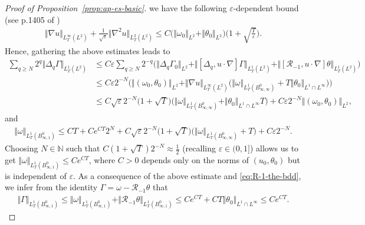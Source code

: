 \documentclass[reqno,11pt,a4paper]{amsart}
\begin{document}
\begin{proof}[Proof of Proposition~\ref{prop:ap-es-basic}]
we have the following $\varepsilon$-dependent bound (see p.1405 of \cite{LXY25})
\begin{align*}
  \Vert \nabla u \Vert _{L^\infty_T(L^2)} + \frac{1}{\sqrt{\varepsilon}} \Vert \nabla^2 u\Vert _{L^2_T(L^2)}
  \leq C \big(\Vert \omega_0\Vert _{L^2} + \Vert \theta_0\Vert _{L^2} \big)\Big(1+\sqrt{\tfrac{T}{\varepsilon}}\Big).
\end{align*}
Hence, gathering the above estimates leads to
\begin{align*}
  \sum_{q\geq N} 2^q \Vert \Delta_q \Gamma\Vert _{L^1_T(L^2)} 
  & \leq C \varepsilon \sum_{q\geq N} 2^{-q} \Big( \Vert \Delta_q \Gamma_0\Vert _{L^2} 
  + \Vert [\Delta_q, u\cdot\nabla]\Gamma\Vert _{L^1_T(L^2)}
  + \Vert [\mathcal{R}_{-1},u\cdot\nabla]\theta\Vert _{L^1_T(L^2)}\Big)\\
  & \leq 
  C \varepsilon  2^{-N} \Big( \Vert (\omega_0,\theta_0)\Vert _{L^2}
  + \Vert \nabla u\Vert _{L^\infty_T(L^2)} \big(\Vert \omega\Vert _{L^1_T(B^0_{\infty,\infty})} + T \Vert \theta_0\Vert _{L^1\cap L^\infty} \big) \Big) \\
  & \leq C \sqrt{\varepsilon} 2^{-N} \big(1+\sqrt{T} \big) \big(\Vert \omega\Vert _{L^1_T(B^0_{\infty,\infty})} 
  + \Vert \theta_0\Vert _{L^1\cap L^\infty}T\big)  + C \varepsilon 2^{-N}  \Vert (\omega_0,\theta_0)\Vert _{L^2},
\end{align*}
and
\begin{align*}
  \Vert \omega\Vert _{L^1_T(B^0_{\infty,1})} \leq C T + C e^{CT} 2^N 
  + C\sqrt{\varepsilon} 2^{-N} \big(1+\sqrt{T} \big) \big(\Vert \omega\Vert _{L^1_T(B^0_{\infty,\infty})} 
  + T\big)  + C \varepsilon 2^{-N} .
\end{align*}
Choosing $N\in \mathbb{N}$ such that $C (1+\sqrt{T})2^{-N}\approx \frac{1}{2}$ (recalling $\varepsilon\in (0,1]$) 
allows us to get $\Vert \omega\Vert _{L^1_T(B^0_{\infty,1})} \leq C e^{CT}$, 
where $C>0$ depends only on the norms of $(u_0,\theta_0)$ but is independent of $\varepsilon$.
As a consequence of the above estimate and \eqref{eq:R-1-the-bdd},
we infer from the identity $\Gamma =\omega - \mathcal{R}_{-1}\theta$ that
\begin{equation}\label{eq:Gam-B0inf-1}
\begin{split}
  \Vert \Gamma\Vert _{L^1_T(B^0_{\infty,1})} \leq \Vert \omega\Vert _{L^1_T(B^0_{\infty,1})} + \Vert \mathcal{R}_{-1}\theta\Vert _{L^1_T(B^0_{\infty,1})} 
  \leq C e^{CT} + C T \Vert \theta_0\Vert _{L^1\cap L^\infty} \leq C e^{CT}.
\end{split}
\end{equation}


\end{proof}
\end{document}
